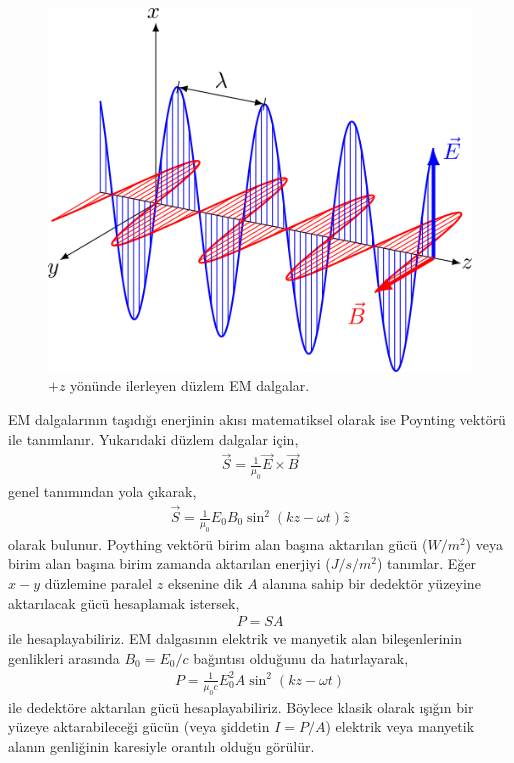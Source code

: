 \documentclass[a4paper,12pt, twoside]{article}
\begin{document}
\begin{figure}[hbtp]
\center
\includegraphics[scale=1.2]{EM_wave_poynting_vector.png}
\caption{$+z$ yönünde ilerleyen düzlem EM dalgalar.}
\label{fig:poynting}
\end{figure}
EM dalgalarının taşıdığı enerjinin akısı matematiksel olarak ise Poynting vektörü ile tanımlanır. Yukarıdaki düzlem dalgalar için,
\begin{align}
\label{eq:poynting_vec}
\vec S = \frac{1}{\mu_0}\vec E \times \vec B
\end{align}
genel tanımından yola çıkarak,
\begin{align}
\label{eq:poynting_plane_wave}
\vec S = \frac{1}{\mu_0} E_0 B_0 \sin^2(kz-\omega t)\hat z
\end{align}
olarak bulunur. Poything vektörü birim alan başına aktarılan gücü ($W/m^2$) veya birim alan başına birim zamanda aktarılan enerjiyi ($J/s/m^2$) tanımlar. Eğer $x-y$ düzlemine paralel $z$ eksenine dik $A$ alanına sahip bir dedektör yüzeyine aktarılacak gücü hesaplamak istersek,
\begin{align}
\label{eq:poynting_power1}
P = S A
\end{align}
ile hesaplayabiliriz. EM dalgasının elektrik ve manyetik alan bileşenlerinin genlikleri arasında $B_0 = E_0/c$ bağıntısı olduğunu da hatırlayarak,
\begin{align}
\label{eq:poynting_power2}
P = \frac{1}{\mu_0 c} E_0^2 A \sin^2(kz-\omega t)
\end{align}
ile dedektöre aktarılan gücü hesaplayabiliriz. Böylece klasik olarak ışığın bir yüzeye aktarabileceği gücün (veya şiddetin $I = P/A$) elektrik veya manyetik alanın genliğinin karesiyle orantılı olduğu görülür.
\end{document}
